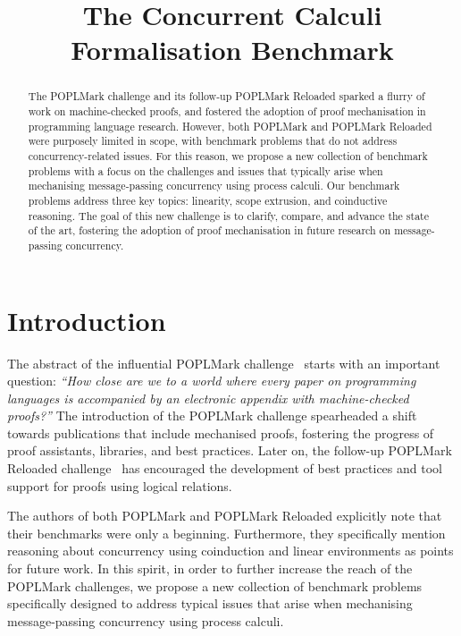 \documentclass[runningheads]{llncs}
\begin{document}
\title{The Concurrent Calculi Formalisation Benchmark}

\maketitle

\begin{abstract}
  The POPLMark challenge and its follow-up POPLMark Re\-loaded sparked a flurry of
  work on machine-checked proofs, and fostered the adoption of proof
  mechanisation in programming language research.  However, both POPLMark and
  POPLMark Reloaded were purposely limited in scope, with benchmark problems
  that do not address concurrency-related issues.
  For this reason, we propose a new collection of benchmark problems with a
  focus on the challenges and issues that typically arise when mechanising
  message-passing concurrency using process calculi.  Our benchmark problems
  address three key topics: linearity, scope extrusion, and coinductive
  reasoning.  The goal of this new challenge is to clarify, compare, and advance
  the state of the art, fostering the adoption of proof mechanisation in future
  research on message-passing concurrency.

\end{abstract}

\section{Introduction}
The abstract of the influential POPLMark challenge~\cite{POPLMark} starts with
an important question: \emph{``How close are we to a world where every paper on
programming languages is accompanied by an electronic appendix with
machine-checked proofs?''} The introduction of the POPLMark
challenge spearheaded a shift towards publications that include
mechanised proofs, fostering the progress of proof assistants,
libraries, and best practices.  Later on, the follow-up POPLMark
Reloaded challenge~\cite{POPLMarkReloaded} has encouraged the development of
best practices and tool support for proofs using logical relations.

The authors of both POPLMark and POPLMark Reloaded explicitly
note that their benchmarks were only a beginning.  Furthermore, they
specifically mention reasoning about concurrency using coinduction and
linear environments as points for future work.  In this spirit, in order to
further increase the reach of the POPLMark challenges, we propose a new
collection of benchmark problems specifically designed to address typical issues
that arise when mechanising message-passing concurrency using process calculi.
\end{document}
